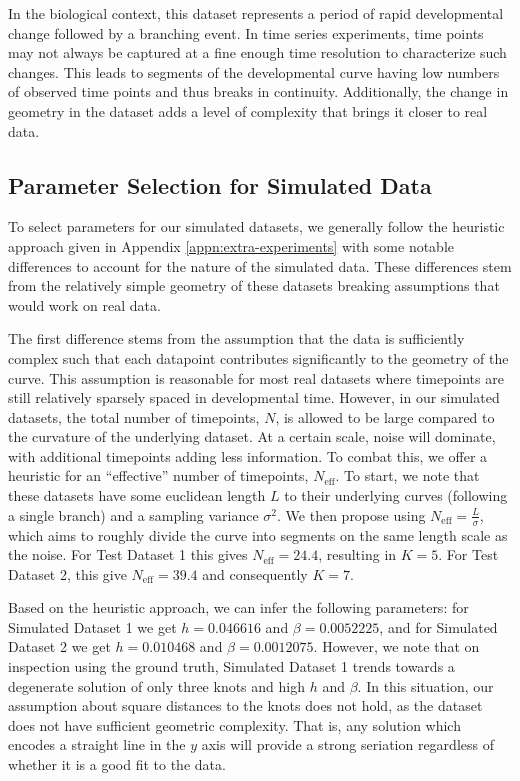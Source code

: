 \documentclass[aos, preprint]{imsart}
\theoremstyle{plain}
\theoremstyle{remark}
\begin{document}
\begin{appendix}
In the biological context, this dataset represents a period of rapid developmental change followed by a branching event. In time series experiments, time points may not always be captured at a fine enough time resolution to characterize such changes. This leads to segments of the developmental curve having low numbers of observed time points and thus breaks in continuity. Additionally, the change in geometry in the dataset adds a level of complexity that brings it closer to real data.

\subsection*{Parameter Selection for Simulated Data}
To select parameters for our simulated datasets, we generally follow the heuristic approach given in Appendix \ref{appn:extra-experiments} with some notable differences to account for the nature of the simulated data. These differences stem from the relatively simple geometry of these datasets breaking assumptions that would work on real data.

The first difference stems from the assumption that the data is sufficiently complex such that each datapoint contributes significantly to the geometry of the curve. This assumption is reasonable for most real datasets where timepoints are still relatively sparsely spaced in developmental time. However, in our simulated datasets, the total number of timepoints, $N$, is allowed to be large compared to the curvature of the underlying dataset. At a certain scale, noise will dominate, with additional timepoints adding less information. To combat this, we offer a heuristic for an ``effective'' number of timepoints, $N_\text{eff}$. To start, we note that these datasets have some euclidean length $L$ to their underlying curves (following a single branch) and a sampling variance $\sigma^2$. We then propose using $N_\text{eff} = \frac{L}{\sigma}$, which aims to roughly divide the curve into segments on the same length scale as the noise. For Test Dataset 1 this gives $N_\text{eff} = 24.4$, resulting in $K = 5$. For Test Dataset 2, this give $N_\text{eff} = 39.4$ and consequently $K = 7$.

Based on the heuristic approach, we can infer the following parameters: for Simulated Dataset 1 we get $h = 0.046616$ and $\beta = 0.0052225$, and for Simulated Dataset 2 we get $h = 0.010468$ and $\beta = 0.0012075$. However, we note that on inspection using the ground truth, Simulated Dataset 1 trends towards a degenerate solution of only three knots and high $h$ and $\beta$. In this situation, our assumption about square distances to the knots does not hold, as the dataset does not have sufficient geometric complexity. That is, any solution which encodes a straight line in the $y$ axis will provide a strong seriation regardless of whether it is a good fit to the data.


\end{appendix}
\end{document}
